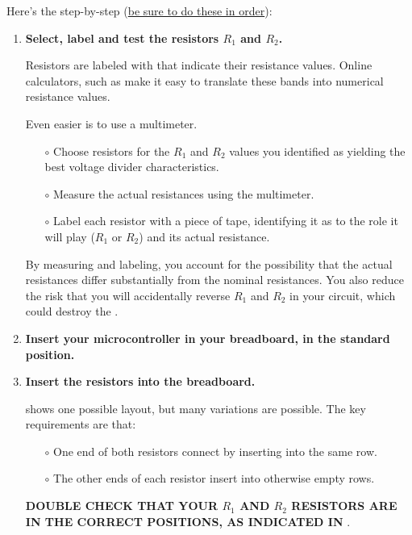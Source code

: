 Here's the step-by-step (\underline{be sure to do these in order}):
\begin{enumerate}
	\item \textbf{Select, label and test the resistors $R_1$ and $R_2$.}
	
	Resistors are labeled with  that indicate their resistance values. 
	Online calculators, such as  make it easy to translate these bands into numerical resistance values. 
	
	\smallskip
	Even easier is to use a multimeter.
	\begin{itemize}
		\item[$\circ$] Choose resistors for the $R_1$ and $R_2$ values you identified as yielding the best voltage divider characteristics.
		\item[$\circ$] Measure the actual resistances using the multimeter.
		\item[$\circ$] Label each resistor with a piece of tape, identifying it as to the role it will play ($R_1$ or $R_2$) and its actual resistance.		
	\end{itemize}
	By measuring and labeling, you account for the possibility that the actual resistances differ substantially from the nominal resistances.
	You also reduce the risk that you will accidentally reverse $R_1$ and $R_2$ in your circuit, which could destroy the \adc.
	
	\item \textbf{Insert your microcontroller in your breadboard, in the standard position.}	
	
	\item \textbf{Insert the resistors into the breadboard.}	
	
	 shows one possible layout, but many variations are possible.
	The key requirements are that:
	\begin{itemize}
		\item[$\circ$] One end of both resistors connect by inserting into the same row.
		\item[$\circ$] The other ends of each resistor insert into otherwise empty rows.	
	\end{itemize}
	\textbf{DOUBLE CHECK THAT YOUR $R_1$ AND $R_2$ RESISTORS ARE IN THE CORRECT POSITIONS, AS INDICATED IN }.
	

\end{enumerate}
